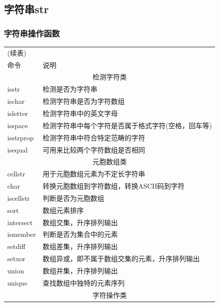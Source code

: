     \subsection{字符串str}
        \subsubsection{字符串操作函数}
            \begin{longtable}{|l|l|}
            \hline
            \endfirsthead
            \multicolumn{2}{l}{(续表)}
            \endhead
            \hline
            \multicolumn{2}{c}{\itshape 接下页表格……}\\
            \endfoot
            \hline
            \endlastfoot
            命令 & 说明 \\
            \hline
            \multicolumn{2}{|c|}{检测字符类}\\
            \hline
            isstr &检测是否为字符串\\
            ischar & 检测字符串是否为字符数组\\
            isletter & 检测字符串中的英文字母\\
            isspace &检测字符串中每个字符是否属于格式字符(空格，回车等)\\
            isstrprop &检测字符串中符合特定范畴的字符\\
            isequal &可用来比较两个字符数组是否相同\\
            \hline
            \multicolumn{2}{|c|}{元胞数组类}\\
            \hline
            cellstr& 用于元胞数组元素为不定长字符串\\
            char & 转换元胞数组到字符数组，转换ASCII码到字符\\
            iscellstr &判断是否为元胞数组\\
            sort & 数组元素排序\\
            intersect& 数组交集，升序排列输出\\
            ismember & 判断是否为集合中的元素\\
            setdiff &数组差集，升序排列输出\\
            setxor & 数组异或，即不属于数组交集的元素，升序排列输出\\
            union &数组并集，升序排列输出\\
            unique & 查找数组中独特的元素序列\\
            \hline
            \multicolumn{2}{|c|}{字符操作类}\\

\end{longtable}
